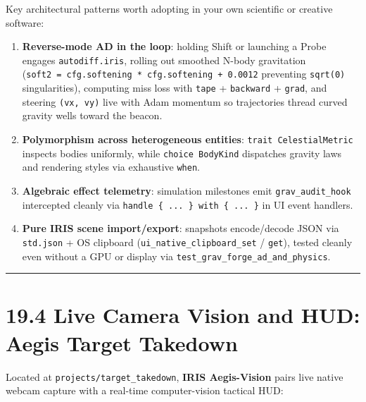 \documentclass[
  english,
  oneside]{book}
\providecommand{\tightlist}{%
  \setlength{\itemsep}{0pt}\setlength{\parskip}{0pt}}
\begin{document}
Key architectural patterns worth adopting in your own scientific or
creative software:

\begin{enumerate}
\def\labelenumi{\arabic{enumi}.}
\tightlist
\item
  \textbf{Reverse-mode AD in the loop}: holding Shift or launching a
  Probe engages \texttt{autodiff.iris}, rolling out smoothed N-body
  gravitation
  (\texttt{soft2\ =\ cfg.softening\ *\ cfg.softening\ +\ 0.0012}
  preventing \texttt{sqrt(0)} singularities), computing miss loss with
  \texttt{tape} + \texttt{backward} + \texttt{grad}, and steering
  \texttt{(vx,\ vy)} live with Adam momentum so trajectories thread
  curved gravity wells toward the beacon.
\item
  \textbf{Polymorphism across heterogeneous entities}:
  \texttt{trait\ CelestialMetric} inspects bodies uniformly, while
  \texttt{choice\ BodyKind} dispatches gravity laws and rendering styles
  via exhaustive \texttt{when}.
\item
  \textbf{Algebraic effect telemetry}: simulation milestones emit
  \texttt{grav\_audit\_hook} intercepted cleanly via
  \texttt{handle\ \{\ ...\ \}\ with\ \{\ ...\ \}} in UI event handlers.
\item
  \textbf{Pure IRIS scene import/export}: snapshots encode/decode JSON
  via \texttt{std.json} + OS clipboard
  (\texttt{ui\_native\_clipboard\_set} / \texttt{get}), tested cleanly
  even without a GPU or display via
  \texttt{test\_grav\_forge\_ad\_and\_physics}.
\end{enumerate}

\begin{center}\rule{0.5\linewidth}{0.5pt}\end{center}

\section{19.4 Live Camera Vision and HUD: Aegis Target
Takedown}\label{live-camera-vision-and-hud-aegis-target-takedown}

Located at \texttt{projects/target\_takedown}, \textbf{IRIS
Aegis-Vision} pairs live native webcam capture with a real-time
computer-vision tactical HUD:
\end{document}

